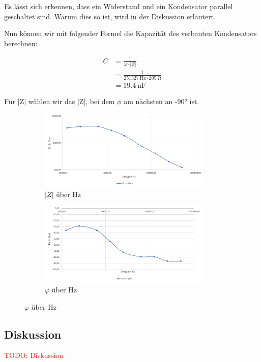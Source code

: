         Es lässt sich erkennen, dass ein Widerstand und ein Kondensator parallel geschaltet sind. Warum dies so ist, wird in der Diskussion erläutert.

        Nun können wir mit folgender Formel die Kapazität des verbauten Kondensators berechnen:
    
        \begin{equation}
            \begin{aligned}
                C &= \frac{1}{\omega \cdot |Z|}\\
                  &= \frac{1}{251327\ \mathrm{Hz} \cdot 205\ \mathrm{\Omega}}\\
                  &= 19.4\ \mathrm{nF}
                \label{eq:Versuch3_Kapazität}
            \end{aligned}
        \end{equation}

        Für |Z| wählen wir das |Z|, bei dem $\phi$ am nächsten an -90° ist.

        \begin{figure}[H]
            \begin{subfigure}{0.5\textwidth}
                \centering
                \includegraphics[width=0.9\textwidth]{bilder/Versuch3_1.png}
                \caption{$|Z|$ über $\mathrm{Hz}$}
                \label{fig:Versuch3_Messwerte_1}
            \end{subfigure}
            \begin{subfigure}{0.5\textwidth}
                \centering
                \includegraphics[width=0.9\textwidth]{bilder/Versuch3_2.png}
                \caption{$\varphi$ über $\mathrm{Hz}$}
                \label{fig:Versuch3_Messwerte_2}
            \end{subfigure}
        \end{figure}

    \subsection{Diskussion}

        \textcolor{red}{TODO: Diskussion}